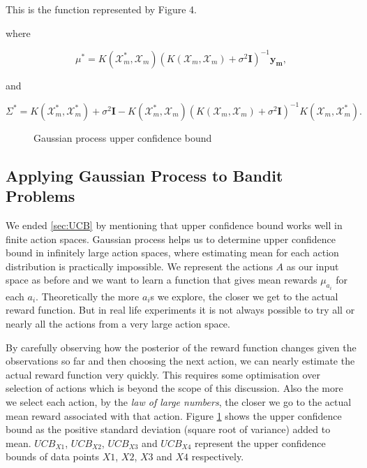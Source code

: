 \documentclass[english]{tktltiki}
\begin{document}
This is the function represented by Figure 4.

where

\begin{equation}
\mu^* = K(\mathcal{X}_m^*, \mathcal{X}_m)(K(\mathcal{X}_m, \mathcal{X}_m) + \sigma^2 \mathbf{I})^{-1}\mathbf{y_m}
\label{gauss_poster_mean},
\end{equation}

and

\begin{equation}
\Sigma^* = K(\mathcal{X}_m^*, \mathcal{X}_m^*) + \sigma^2 \mathbf{I} - K(\mathcal{X}_m^*, \mathcal{X}_m)(K(\mathcal{X}_m, \mathcal{X}_m) + \sigma^2 \mathbf{I})^{-1} K(\mathcal{X}_m, \mathcal{X}_m^*).
\label{gauss_poster_var}
\end{equation}

\begin{figure}[htb] 
\centering
 
\caption{Gaussian process upper confidence bound}
\label{fig:gp_ucb}
\end{figure}

\subsection{Applying Gaussian Process to Bandit Problems}

We ended \ref{sec:UCB} by mentioning that upper confidence bound works well in finite action spaces. Gaussian process helps us to determine upper confidence bound in infinitely large action spaces, where estimating mean for each action distribution is practically impossible. We represent the actions $A$ as our input space as before and we want to learn a function that gives mean rewards $\mu_{a_i}$ for each $a_i$. Theoretically the more $a_i$s we explore, the closer we get to the actual reward function. But in real life experiments it is not always possible to try all or nearly all the actions from a very large action space.





By carefully observing how the posterior of the reward function changes given the observations so far and then choosing the next action, we can nearly estimate the actual reward function very quickly. This requires some optimisation over selection of actions which is beyond the scope of this discussion. Also the more we select each action, by the \textit{law of large numbers}, the closer we go to the actual mean reward associated with that action. Figure \ref{fig:gp_ucb} shows the upper confidence bound as the positive standard deviation (square root of variance) added to mean. $UCB_{X1}$, $UCB_{X2}$, $UCB_{X3}$ and $UCB_{X4}$ represent the upper confidence bounds of data points $X1$, $X2$, $X3$ and $X4$ respectively.
\end{document}
